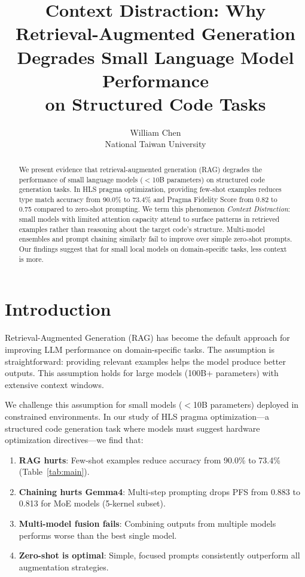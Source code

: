 \documentclass[11pt]{article}
\title{Context Distraction: Why Retrieval-Augmented Generation\\
Degrades Small Language Model Performance\\on Structured Code Tasks}
\author{William Chen\\
National Taiwan University}
\date{}
\begin{document}
\maketitle

\begin{abstract}
We present evidence that retrieval-augmented generation (RAG) degrades
the performance of small language models ($<$10B parameters) on
structured code generation tasks. In HLS pragma optimization,
providing few-shot examples reduces type match accuracy from 90.0\%
to 73.4\% and Pragma Fidelity Score from 0.82 to 0.75 compared to
zero-shot prompting. We term this phenomenon \emph{Context Distraction}:
small models with limited attention capacity attend to surface patterns
in retrieved examples rather than reasoning about the target code's
structure. Multi-model ensembles and prompt chaining similarly fail
to improve over simple zero-shot prompts. Our findings suggest that
for small local models on domain-specific tasks, less context is more.
\end{abstract}

\section{Introduction}

Retrieval-Augmented Generation (RAG) has become the default approach
for improving LLM performance on domain-specific tasks. The assumption
is straightforward: providing relevant examples helps the model produce
better outputs. This assumption holds for large models (100B+
parameters) with extensive context windows.

We challenge this assumption for small models ($<$10B parameters)
deployed in constrained environments. In our study of HLS pragma
optimization---a structured code generation task where models must
suggest hardware optimization directives---we find that:

\begin{enumerate}
    \item \textbf{RAG hurts}: Few-shot examples reduce accuracy from
    90.0\% to 73.4\% (Table~\ref{tab:main}).
    \item \textbf{Chaining hurts Gemma4}: Multi-step prompting drops
    PFS from 0.883 to 0.813 for MoE models (5-kernel subset).
    \item \textbf{Multi-model fusion fails}: Combining outputs from
    multiple models performs worse than the best single model.
    \item \textbf{Zero-shot is optimal}: Simple, focused prompts
    consistently outperform all augmentation strategies.
\end{enumerate}
\end{document}
